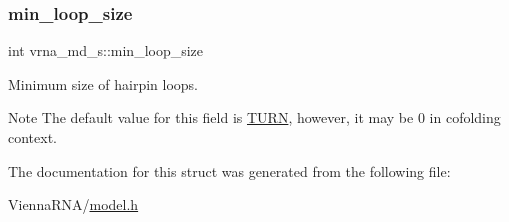 \subsubsection{\texorpdfstring{min\+\_\+loop\+\_\+size}{min\_loop\_size}}
{\footnotesize\ttfamily int vrna\+\_\+md\+\_\+s\+::min\+\_\+loop\+\_\+size}



Minimum size of hairpin loops. 

\begin{DoxyNote}{Note}
The default value for this field is \mbox{\hyperlink{energy__const_8h_ae646250fd59311356c7e5722a81c3a96}{T\+U\+RN}}, however, it may be 0 in cofolding context. 
\end{DoxyNote}


The documentation for this struct was generated from the following file\+:\begin{DoxyCompactItemize}
\item 
Vienna\+R\+N\+A/\mbox{\hyperlink{model_8h}{model.\+h}}\end{DoxyCompactItemize}
